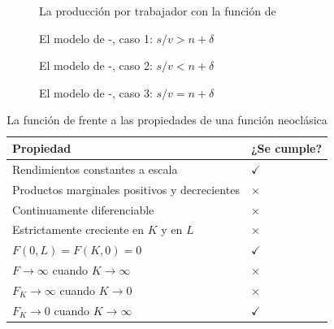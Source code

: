 \documentclass[11pt]{article}
\begin{document}
\begin{figure}[H]
\centering
\caption{La producción por trabajador con la función de }\label{fig:hd-produccion}
\end{figure}

\begin{figure}[H]
\centering
\caption{El modelo de -, caso 1: $s/v>n+\delta$}\label{fig:hd-caso1}
\end{figure}

\begin{figure}[H]
\centering
\caption{El modelo de -, caso 2: $s/v<n+\delta$}\label{fig:hd-caso2}
\end{figure}

\begin{figure}[H]
\centering
\caption{El modelo de -, caso 3: $s/v=n+\delta$}\label{fig:hd-caso3}
\end{figure}

\begin{table}[H]
\centering
\caption{La función de  frente a las propiedades de una función neoclásica}\label{tab:leontief-inada}
\small
\renewcommand{\arraystretch}{1.3}
\begin{tabular}{>{\raggedright\arraybackslash}m{7.6cm}>{\centering\arraybackslash}m{2cm}}
\toprule
\rowcolor{tceeazulpalido}
\textbf{Propiedad} & \textbf{¿Se cumple?}\\
\midrule
Rendimientos constantes a escala & \textcolor{tceeverde}{$\checkmark$}\\
Productos marginales positivos y decrecientes & \textcolor{tceerojo}{$\times$}\\
Continuamente diferenciable & \textcolor{tceerojo}{$\times$}\\
Estrictamente creciente en $K$ y en $L$ & \textcolor{tceerojo}{$\times$}\\
$F(0,L)=F(K,0)=0$ & \textcolor{tceeverde}{$\checkmark$}\\
$F\to\infty$ cuando $K\to\infty$ & \textcolor{tceerojo}{$\times$}\\
$F_K\to\infty$ cuando $K\to0$ & \textcolor{tceerojo}{$\times$}\\
$F_K\to0$ cuando $K\to\infty$ & \textcolor{tceeverde}{$\checkmark$}\\
\bottomrule
\end{tabular}
\end{table}
\end{document}
